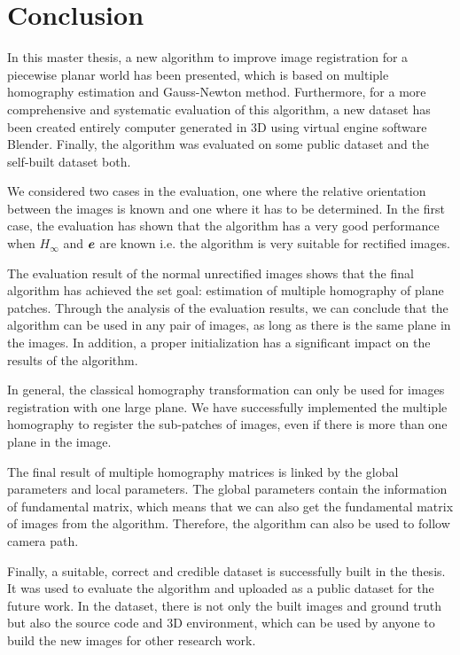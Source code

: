 \chapter{Conclusion}\label{ch:Conclusion}
In this master thesis, a new algorithm to improve image registration for a piecewise planar world has been presented, which is based on multiple homography estimation and Gauss-Newton method. Furthermore, for a more comprehensive and systematic evaluation of this algorithm, a new dataset has been created entirely computer generated in 3D using virtual engine software Blender. Finally, the algorithm was evaluated on some public dataset and the self-built dataset both.

We considered two cases in the evaluation, one where the relative orientation between the images is known and one where it has to be determined. In the first case, the evaluation has shown that the algorithm has a very good performance when $H_{\infty}$ and $\boldsymbol{e}$ are known i.e. the algorithm is very suitable for rectified images. 

The evaluation result of the normal unrectified images shows that the final algorithm has achieved the set goal: estimation of multiple homography of plane patches. Through the analysis of the evaluation results, we can conclude that the algorithm can be used in any pair of images, as long as there is the same plane in the images. In addition, a proper initialization has a significant impact on the results of the algorithm. 

In general, the classical homography transformation can only be used for images registration with one large plane. We have successfully implemented the multiple homography to register the sub-patches of images, even if there is more than one plane in the image. 

The final result of multiple homography matrices is linked by the global parameters and local parameters. The global parameters contain the information of fundamental matrix, which means that we can also get the fundamental matrix of images from the algorithm. Therefore, the algorithm can also be used to follow camera path.

Finally, a suitable, correct and credible dataset is successfully built in the thesis. It was used to evaluate the algorithm and uploaded as a public dataset for the future work. In the dataset, there is not only the built images and ground truth but also the source code and 3D environment, which can be used by anyone to build the new images for other research work.


